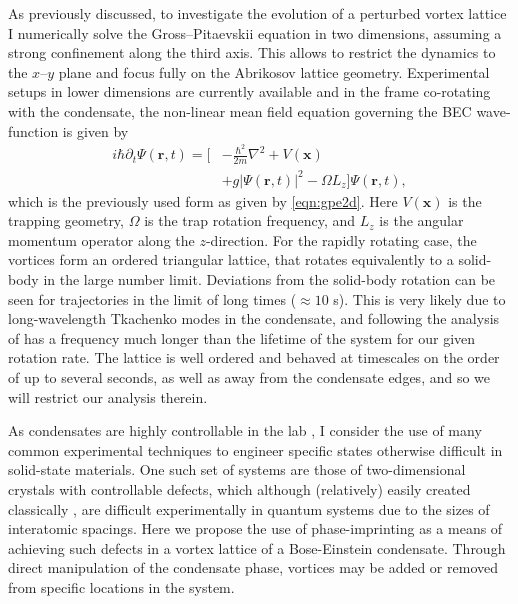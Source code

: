 As previously discussed, to investigate the evolution of a perturbed vortex lattice I numerically solve the Gross--Pitaevskii equation in two dimensions, assuming a strong confinement along the third axis. This allows to restrict the dynamics to the $x$--$y$ plane and focus fully on the Abrikosov lattice geometry. Experimental setups in lower dimensions are currently available \cite{BEC:Stock_lpl_2004,BEC:Seo_jkps_2014,BEC:Chomaz_natcom_2015} and in the frame co-rotating with the condensate, the non-linear mean field equation governing the BEC wave-function is given by
\begin{align}
i\hbar\partial_t \Psi(\mathbf{r},t) = \Big[&-\frac{\hbar^2}{2m}\nabla^2 + V\left(\mathbf{x}\right) \nonumber\\
&+ g\vert \Psi(\mathbf{r},t) \vert^2- \Omega L_z \Big]\Psi(\mathbf{r},t),
\end{align}
which is the previously used form as given by \ref{eqn:gpe2d}.
Here $V\left(\mathbf{x}\right)$ is the trapping geometry, $\Omega$ is the trap rotation frequency, and $L_z$ is the angular momentum operator along the $z$-direction. For the rapidly rotating case, the vortices form an ordered triangular lattice, that rotates equivalently to a solid-body in the large number limit. Deviations from the solid-body rotation can be seen for trajectories in the limit of long times ($\approx 10$ s). This is very likely due to long-wavelength Tkachenko modes in the condensate, and following the analysis of \cite{BEC:Baym_prl_2003} has a frequency much longer than the lifetime of the system for our given rotation rate.
The lattice is well ordered and behaved at timescales on the order of up to several seconds, as well as away from the condensate edges, and so we
will restrict our analysis therein.

As condensates are highly controllable in the lab \cite{BEC:Fetter_rmp_2009}, I consider the use of many common experimental techniques to engineer specific states otherwise difficult in solid-state materials. One such set of systems are those of two-dimensional crystals with controllable defects, which although (relatively) easily created classically \cite{XTAL:Bragg_prsa_1947,OPT:Kim_spie_2011}, are difficult experimentally in quantum systems due to the sizes of interatomic spacings. Here we propose the use of phase-imprinting \cite{Vtx:Dobrek_pra_1999} as a means of achieving such defects in a vortex lattice of a Bose-Einstein condensate. Through direct manipulation of the condensate phase, vortices may be added or removed from specific locations in the system.

